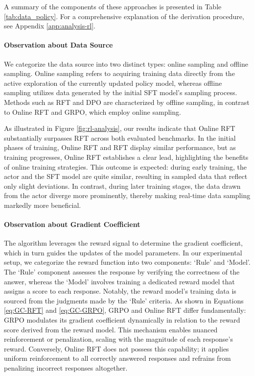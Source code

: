 \begin{itemize}[topsep=0pt]
\begin{itemize}[topsep=0pt]
A summary of the components of these approaches is presented in Table \ref{tab:data_policy}. For a comprehensive explanation of the derivation procedure, see Appendix \ref{app:analysis-rl}.

\paragraph{Observation about Data Source} We categorize the data source into two distinct types: online sampling and offline sampling. Online sampling refers to acquiring training data directly from the active exploration of the currently updated policy model, whereas offline sampling utilizes data generated by the initial SFT model's sampling process. Methods such as RFT and DPO are characterized by offline sampling, in contrast to Online RFT and GRPO, which employ online sampling.

As illustrated in Figure \ref{fig:rl-analysis}, our results indicate that Online RFT substantially surpasses RFT across both evaluated benchmarks. In the initial phases of training, Online RFT and RFT display similar performance, but as training progresses, Online RFT establishes a clear lead, highlighting the benefits of online training strategies. This outcome is expected: during early training, the actor and the SFT model are quite similar, resulting in sampled data that reflect only slight deviations. In contrast, during later training stages, the data drawn from the actor diverge more prominently, thereby making real-time data sampling markedly more beneficial.

\paragraph{Observation about Gradient Coefficient} The algorithm leverages the reward signal to determine the gradient coefficient, which in turn guides the updates of the model parameters. In our experimental setup, we categorize the reward function into two components: ‘Rule’ and ‘Model’. The ‘Rule’ component assesses the response by verifying the correctness of the answer, whereas the ‘Model’ involves training a dedicated reward model that assigns a score to each response. Notably, the reward model’s training data is sourced from the judgments made by the ‘Rule’ criteria. As shown in Equations \ref{eq:GC-RFT} and \ref{eq:GC-GRPO}, GRPO and Online RFT differ fundamentally: GRPO modulates its gradient coefficient dynamically in relation to the reward score derived from the reward model. This mechanism enables nuanced reinforcement or penalization, scaling with the magnitude of each response’s reward. Conversely, Online RFT does not possess this capability; it applies uniform reinforcement to all correctly answered responses and refrains from penalizing incorrect responses altogether.


\end{itemize}
\end{itemize}
